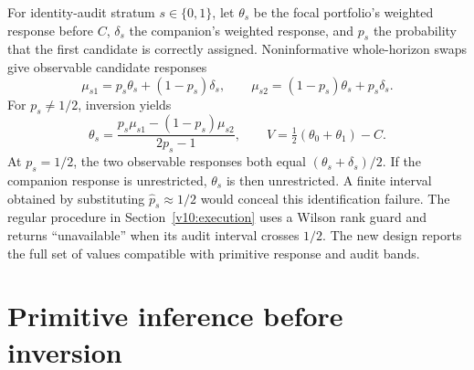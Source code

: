 For identity-audit stratum $s\in\{0,1\}$, let $\theta_s$ be the focal
portfolio's weighted response before $C$, $\delta_s$ the companion's weighted
response, and $p_s$ the probability that the first candidate is correctly
assigned. Noninformative whole-horizon swaps give observable candidate
responses
\begin{equation}\label{integrated:weak_audit_projection:eq:mixture}
 \mu_{s1}=p_s\theta_s+(1-p_s)\delta_s,\qquad
 \mu_{s2}=(1-p_s)\theta_s+p_s\delta_s.
\end{equation}
For $p_s\ne 1/2$, inversion yields
\begin{equation}\label{integrated:weak_audit_projection:eq:inverse}
 \theta_s=\frac{p_s\mu_{s1}-(1-p_s)\mu_{s2}}{2p_s-1},\qquad
 V=\tfrac12(\theta_0+\theta_1)-C.
\end{equation}
At $p_s=1/2$, the two observable responses both equal
$(\theta_s+\delta_s)/2$. If the companion response is unrestricted,
$\theta_s$ is then unrestricted. A finite interval obtained by substituting
$\widehat p_s\approx1/2$ would conceal this identification failure. The regular procedure in Section~\ref{v10:execution}
uses a Wilson rank guard and returns
``unavailable'' when its audit interval crosses $1/2$. The new design reports
the full set of values compatible with primitive response and audit bands.

\section{Primitive inference before inversion}

